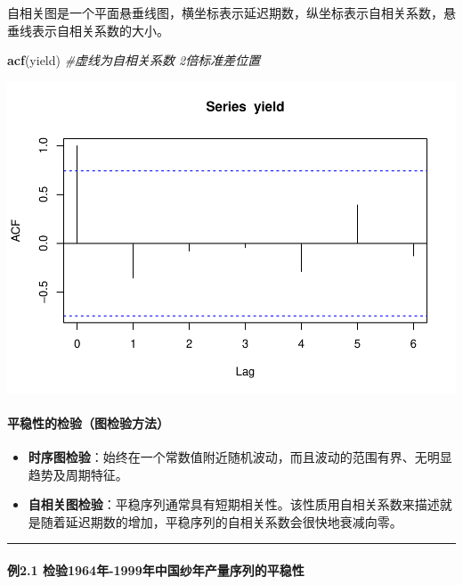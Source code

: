 \documentclass[]{article}
\newenvironment{Shaded}{\begin{snugshade}}{\end{snugshade}}
\newcommand{\CommentTok}[1]{\textcolor[rgb]{0.56,0.35,0.01}{\textit{#1}}}
\newcommand{\KeywordTok}[1]{\textcolor[rgb]{0.13,0.29,0.53}{\textbf{#1}}}
\newcommand{\NormalTok}[1]{#1}
\let\oldparagraph\paragraph
\renewcommand{\paragraph}[1]{\oldparagraph{#1}\mbox{}}
\begin{document}
自相关图是一个平面悬垂线图，横坐标表示延迟期数，纵坐标表示自相关系数，悬垂线表示自相关系数的大小。

\begin{Shaded}
\begin{Highlighting}[]
\KeywordTok{acf}\NormalTok{(yield) }\CommentTok{#虚线为自相关系数 2倍标准差位置}
\end{Highlighting}
\end{Shaded}

\includegraphics{timeseries_files/figure-latex/unnamed-chunk-9-1.pdf}

\hypertarget{ux5e73ux7a33ux6027ux7684ux68c0ux9a8cux56feux68c0ux9a8cux65b9ux6cd5}{%
\paragraph{平稳性的检验（图检验方法）}\label{ux5e73ux7a33ux6027ux7684ux68c0ux9a8cux56feux68c0ux9a8cux65b9ux6cd5}}

\begin{itemize}
\item
  \textbf{时序图检验}：始终在一个常数值附近随机波动，而且波动的范围有界、无明显趋势及周期特征。
\item
  \textbf{自相关图检验}：平稳序列通常具有短期相关性。该性质用自相关系数来描述就是随着延迟期数的增加，平稳序列的自相关系数会很快地衰减向零。
\end{itemize}

\begin{center}\rule{0.5\linewidth}{\linethickness}\end{center}

\hypertarget{ux4f8b2.1-ux68c0ux9a8c1964ux5e74-1999ux5e74ux4e2dux56fdux7eb1ux5e74ux4ea7ux91cfux5e8fux5217ux7684ux5e73ux7a33ux6027}{%
\paragraph{例2.1
检验1964年-1999年中国纱年产量序列的平稳性}\label{ux4f8b2.1-ux68c0ux9a8c1964ux5e74-1999ux5e74ux4e2dux56fdux7eb1ux5e74ux4ea7ux91cfux5e8fux5217ux7684ux5e73ux7a33ux6027}}
\end{document}
